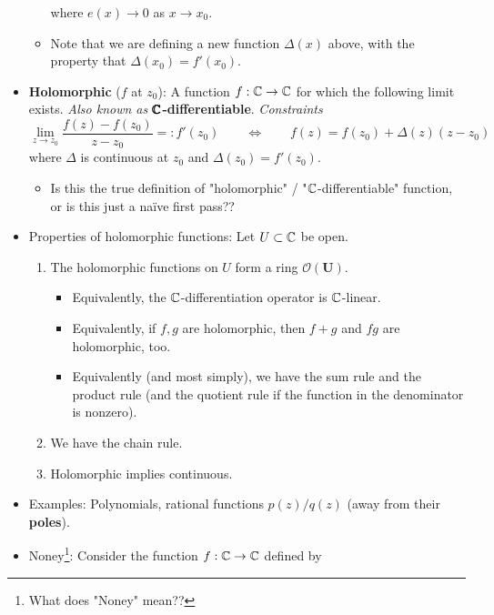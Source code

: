 \documentclass[../notes.tex]{subfiles}
\begin{document}
\begin{itemize}
\begin{itemize}
\begin{equation*}
        \end{equation*}
        where $e(x)\to 0$ as $x\to x_0$.
        \item Note that we are defining a new function $\Delta(x)$ above, with the property that $\Delta(x_0)=f'(x_0)$.
    \end{itemize}
    \pagebreak
    \item \textbf{Holomorphic} ($f$ at $z_0$): A function $f:\mathbb{C}\to\mathbb{C}$ for which the following limit exists. \emph{Also known as} \textbf{$\pmb{\mathbb{C}}$-differentiable}. \emph{Constraints}
    \begin{equation*}
        \lim_{z\to z_0}\frac{f(z)-f(z_0)}{z-z_0} =: f'(z_0)
        \qquad\Longleftrightarrow\qquad
        f(z) = f(z_0)+\Delta(z)(z-z_0)
    \end{equation*}
    where $\Delta$ is continuous at $z_0$ and $\Delta(z_0)=f'(z_0)$.
    \begin{itemize}
        \item Is this the true definition of "holomorphic" / "$\mathbb{C}$-differentiable" function, or is this just a na\"{i}ve first pass??
    \end{itemize}
    \item Properties of holomorphic functions: Let $U\subset\mathbb{C}$ be open.
    \begin{enumerate}
        \item The holomorphic functions on $U$ form a ring $\bm{\mathcal{O}(U)}$.
        \begin{itemize}
            \item Equivalently, the $\mathbb{C}$-differentiation operator is $\mathbb{C}$-linear.
            \item Equivalently, if $f,g$ are holomorphic, then $f+g$ and $fg$ are holomorphic, too.
            \item Equivalently (and most simply), we have the sum rule and the product rule (and the quotient rule if the function in the denominator is nonzero).
        \end{itemize}
        \item We have the chain rule.
        \item Holomorphic implies continuous.
    \end{enumerate}
    \item Examples: Polynomials, rational functions $p(z)/q(z)$ (away from their \textbf{poles}).
    \item Noney\footnote{What does "Noney" mean??}: Consider the function $f:\mathbb{C}\to\mathbb{C}$ defined by
    \begin{equation*}

\end{equation*}
\end{itemize}
\end{document}
